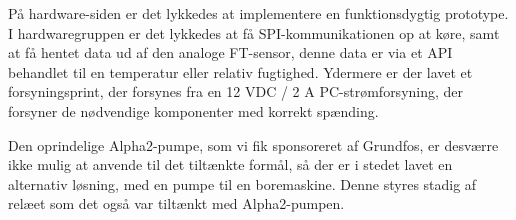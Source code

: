 
På hardware-siden er det lykkedes at implementere en funktionsdygtig prototype.
I hardwaregruppen er det lykkedes at få SPI-kommunikationen op at køre, samt at få hentet data ud af den analoge FT-sensor, denne data er via et API behandlet til en temperatur eller relativ fugtighed.
Ydermere er der lavet et forsyningsprint, der forsynes fra en 12 VDC / 2 A PC-strømforsyning, der forsyner de nødvendige komponenter med korrekt spænding.

Den oprindelige Alpha2-pumpe, som vi fik sponsoreret af Grundfos, er desværre ikke mulig at anvende til det tiltænkte formål, så der er i stedet lavet en alternativ løsning, med en pumpe til en boremaskine. Denne styres stadig af relæet som det også var tiltænkt med Alpha2-pumpen. 

